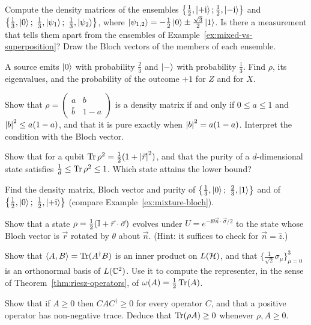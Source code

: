 \begin{exerciseset}
   Compute the density matrices of the ensembles $\bigl\{\tfrac12,\left|+\mathrm{i}\right\rangle;\tfrac12,\left|-\mathrm{i}\right\rangle\bigr\}$ and $\bigl\{\tfrac13,\ket0;\ \tfrac13,\ket{\psi_1};\ \tfrac13,\ket{\psi_2}\bigr\}$, where $\left|\psi_{1,2}\right\rangle=-\tfrac12\left|0\right\rangle\pm\tfrac{\sqrt3}2\left|1\right\rangle$. Is there a measurement that tells them apart from the ensembles of Example~\ref{ex:mixed-vs-superposition}? Draw the Bloch vectors of the members of each ensemble.

   A source emits $\left|0\right\rangle$ with probability $\tfrac23$ and $\left|-\right\rangle$ with probability $\tfrac13$. Find $\rho$, its eigenvalues, and the probability of the outcome $+1$ for $Z$ and for $X$.

  \label{ex:positive-hermitian-sec} Show that $\rho=\begin{pmatrix}a&b\\\bar b&1-a\end{pmatrix}$ is a density matrix if and only if $0\le a\le1$ and $\left|b\right|^2\le a(1-a)$, and that it is pure exactly when $\left|b\right|^2=a(1-a)$. Interpret the condition with the Bloch vector.

   Show that for a qubit $\operatorname{Tr}\rho^2=\tfrac12(1+\left|\vec r\right|^2)$, and that the purity of a $d$-dimensional state satisfies $\tfrac1d\le\operatorname{Tr}\rho^2\le1$. Which state attains the lower bound?

   Find the density matrix, Bloch vector and purity of $\bigl\{\tfrac13,\ket0;\ \tfrac23,\ket1\bigr\}$ and of $\bigl\{\tfrac12,\ket0;\ \tfrac12,\ket{+\ii}\bigr\}$ (compare Example~\ref{ex:mixture-bloch}).

   Show that a state $\rho=\tfrac12(\mathbb{I}+\vec r\cdot\vec\sigma)$ evolves under $U=e^{-\ii\theta\vec n\cdot\vec\sigma/2}$ to the state whose Bloch vector is $\vec r$ rotated by $\theta$ about $\vec n$. (Hint: it suffices to check for $\vec n=\hat z$.)

  \label{ex:hs-inner} Show that $\langle A,B\rangle=\operatorname{Tr}(A^\dagger B)$ is an inner product on $L(\mathcal{H})$, and that $\{\tfrac1{\sqrt2}\sigma_\mu\}_{\mu=0}^3$ is an orthonormal basis of $L(\mathbb{C}^2)$. Use it to compute the representer, in the sense of Theorem~\ref{thm:riesz-operators}, of $\omega(A)=\tfrac12\operatorname{Tr}(A)$.

  \label{ex:conjugation-positive} Show that if $A\ge0$ then $CAC^\dagger\ge0$ for every operator $C$, and that a positive operator has non-negative trace. Deduce that $\operatorname{Tr}(\rho A)\ge0$ whenever $\rho,A\ge0$.


\end{exerciseset}
